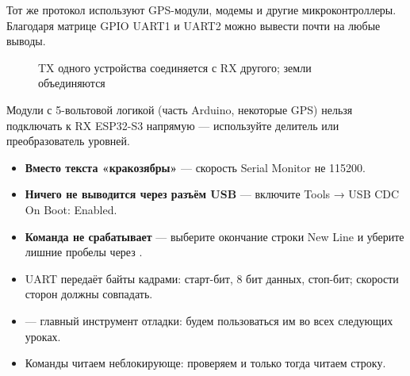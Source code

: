 Тот же протокол используют GPS-модули, модемы и другие микроконтроллеры. Благодаря матрице GPIO
UART1 и UART2 можно вывести почти на любые выводы.

\begin{figure}[H]
\centering
{}
\caption{TX одного устройства соединяется с RX другого; земли объединяются}
\end{figure}


\begin{caution}
Модули с 5-вольтовой логикой (часть Arduino, некоторые GPS) нельзя подключать к RX ESP32-S3 напрямую ---
используйте делитель или преобразователь уровней.
\end{caution}

\begin{trouble}
\begin{itemize}[leftmargin=*]
  \item \textbf{Вместо текста «кракозябры»} --- скорость Serial Monitor не 115200.
  \item \textbf{Ничего не выводится через разъём USB} --- включите \textsf{Tools → USB CDC On Boot: Enabled}.
  \item \textbf{Команда не срабатывает} --- выберите окончание строки \textsf{New Line} и уберите лишние пробелы через .
\end{itemize}
\end{trouble}

\begin{summary}
\begin{itemize}[leftmargin=*]
  \item UART передаёт байты кадрами: старт-бит, 8 бит данных, стоп-бит; скорости сторон должны совпадать.
  \item {} --- главный инструмент отладки: будем пользоваться им во всех следующих уроках.
  \item Команды читаем неблокирующе: проверяем  и только тогда читаем строку.
\end{itemize}
\end{summary}

